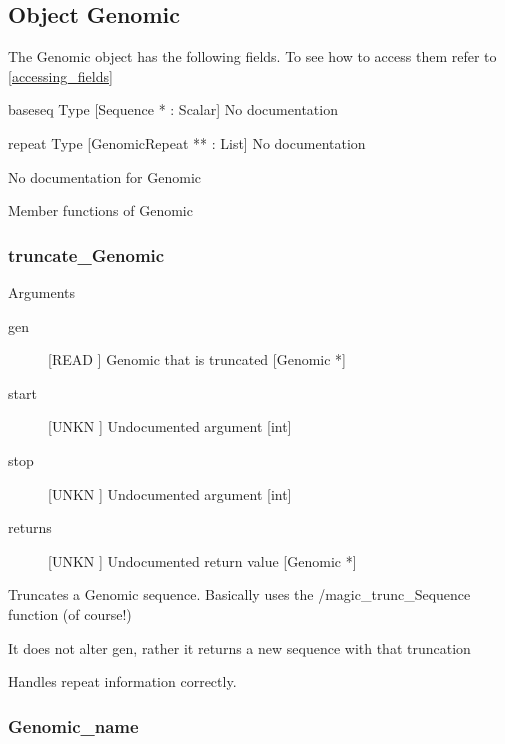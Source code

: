 \subsection{Object Genomic}

\label{object_Genomic}

The Genomic object has the following fields. To see how to access them refer to \ref{accessing_fields}
\begin{description}
\item{baseseq} Type [Sequence * : Scalar] No documentation

\item{repeat} Type [GenomicRepeat ** : List] No documentation

\end{description}
No documentation for Genomic

Member functions of Genomic

\subsubsection{truncate_Genomic}

Arguments
\begin{description}
\item[gen] [READ ] Genomic that is truncated [Genomic *]
\item[start] [UNKN ] Undocumented argument [int]
\item[stop] [UNKN ] Undocumented argument [int]
\item[returns] [UNKN ] Undocumented return value [Genomic *]
\end{description}
Truncates a Genomic sequence. Basically uses
the /magic_trunc_Sequence function (of course!)


It does not alter gen, rather it returns a new
sequence with that truncation


Handles repeat information correctly.


\subsubsection{Genomic_name}

